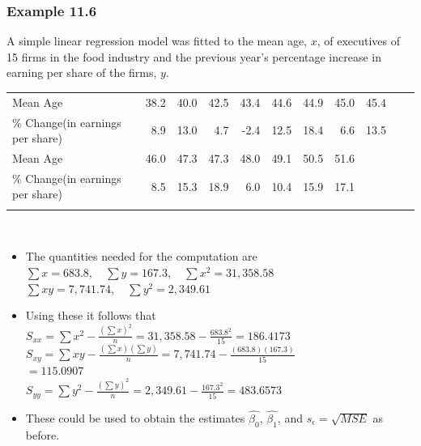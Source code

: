 \documentclass[xcolor=dvipsnames,12pt]{beamer}
\begin{document}
\begin{frame}
\frametitle{Example 11.6}
A simple linear regression model was fitted to the mean age, 
$x$, of executives of 15 firms in the food industry and the
previous year's percentage increase in earning per share of the
firms, $y$.\\
\begin{tiny}
\begin{tabular}[t]{lrrrrrrrrrr}
\hline 
Mean Age &38.2 &40.0 &42.5 &43.4 &44.6 &44.9 &45.0 &45.4 \\
\% Change(in earnings per share) &8.9 &13.0 &4.7 &-2.4 &12.5 &18.4
&6.6 &13.5  \\[.1in]
Mean Age &46.0 &47.3 &47.3 &48.0  &49.1  &50.5  &51.6\\
\% Change(in earnings per share)  &8.5  &15.3  &18.9  &6.0  &10.4
&15.9  &17.1\\ \hline \\[.1in]
\end{tabular}
\end{tiny}\\
\begin{itemize}
\item The quantities needed for the computation are \\
  $ \sum x = 683.8,\quad \sum y =167.3 ,\quad \sum x^2=31,358.58$\\
$ \sum xy=7,741.74,\quad \sum y^2=2,349.61$
\end{itemize}
\end{frame}



\begin{frame}
\begin{itemize}
\item Using these it follows that\\
$S_{xx} = \sum x^2 - \frac{(\sum x)^2}{n}
              =31,358.58-\frac{ 683.8^2}{15}=186.4173$\\
$S_{xy} = \sum xy - \frac{(\sum x)(\sum y)}{n}
            =7,741.74-\frac{(683.8)(167.3)}{15}$\\
$= 115.0907$\\
$S_{yy} = \sum y^2 - \frac{(\sum y)^2}{n}=2,349.61-\frac{167.3^2}{15}=
483.6573$
\item These could be used to obtain the estimates $\hat{\beta_0}$, 
$\hat{\beta_1}$, and $s_\epsilon=\sqrt{MSE}$ as before.
\end{itemize}
\end{frame}
\end{document}
